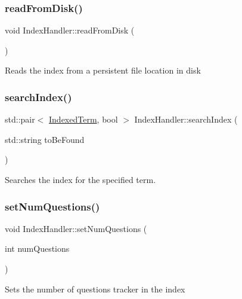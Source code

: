 \subsubsection{\texorpdfstring{read\+From\+Disk()}{readFromDisk()}}
{\footnotesize\ttfamily void Index\+Handler\+::read\+From\+Disk (\begin{DoxyParamCaption}{ }\end{DoxyParamCaption})}

Reads the index from a persistent file location in disk \mbox{\label{classIndexHandler_a1592db23c246bf89a8f7c3e588eb9594}} 
\subsubsection{\texorpdfstring{search\+Index()}{searchIndex()}}
{\footnotesize\ttfamily std\+::pair$<$ \mbox{\hyperlink{classIndexedTerm}{Indexed\+Term}}, bool $>$ Index\+Handler\+::search\+Index (\begin{DoxyParamCaption}\item[{std\+::string}]{to\+Be\+Found }\end{DoxyParamCaption})}

Searches the index for the specified term. \mbox{\label{classIndexHandler_a54590047896406242794a9a614018d17}} 
\subsubsection{\texorpdfstring{set\+Num\+Questions()}{setNumQuestions()}}
{\footnotesize\ttfamily void Index\+Handler\+::set\+Num\+Questions (\begin{DoxyParamCaption}\item[{int}]{num\+Questions }\end{DoxyParamCaption})}

Sets the number of questions tracker in the index \mbox{\label{classIndexHandler_ab94847987a3df0a1c52ceba59679b9ff}} 
